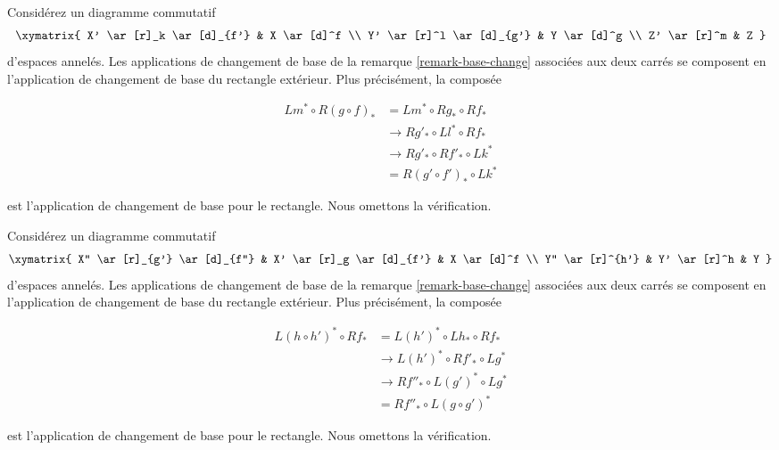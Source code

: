 \begin{remark}

\label{remark-compose-base-change}

Considérez un diagramme commutatif
$$
\xymatrix{
X' \ar[r]_k \ar[d]_{f'} & X \ar[d]^f \\
Y' \ar[r]^l \ar[d]_{g'} & Y \ar[d]^g \\
Z' \ar[r]^m & Z
}
$$
d'espaces annelés. Les applications de changement de base de la remarque \ref{remark-base-change}
associées aux deux carrés se composent en l'application de changement de base du rectangle extérieur. Plus précisément, la composée

\begin{align*}
Lm^* \circ R(g \circ f)_*
& =
Lm^* \circ Rg_* \circ Rf_* \\
& \to Rg'_* \circ Ll^* \circ Rf_* \\
& \to Rg'_* \circ Rf'_* \circ Lk^* \\
& = R(g' \circ f')_* \circ Lk^*
\end{align*}

est l'application de changement de base pour le rectangle. Nous omettons la vérification.

\end{remark}

\begin{remark}

\label{remark-compose-base-change-horizontal}

Considérez un diagramme commutatif
$$
\xymatrix{
X'' \ar[r]_{g'} \ar[d]_{f''} & X' \ar[r]_g \ar[d]_{f'} & X \ar[d]^f \\
Y'' \ar[r]^{h'} & Y' \ar[r]^h & Y
}
$$
d'espaces annelés. Les applications de changement de base de la remarque \ref{remark-base-change}
associées aux deux carrés se composent en l'application de changement de base du rectangle extérieur. Plus précisément, la composée

\begin{align*}
L(h \circ h')^* \circ Rf_*
& =
L(h')^* \circ Lh_* \circ Rf_* \\
& \to L(h')^* \circ Rf'_* \circ Lg^* \\
& \to Rf''_* \circ L(g')^* \circ Lg^* \\
& = Rf''_* \circ L(g \circ g')^*
\end{align*}

est l'application de changement de base pour le rectangle. Nous omettons la vérification.

\end{remark}


